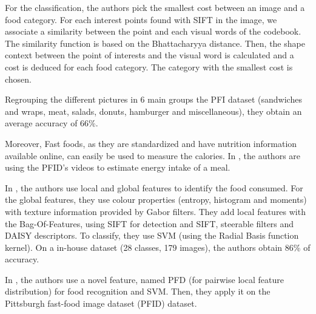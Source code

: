 For the classification, the authors pick the smallest cost between an image and a food category. For each interest points found with SIFT in the image, we associate a similarity between the point and each visual words of the codebook. The similarity function is based on the Bhattacharyya distance. Then, the shape context between the point of interests and the visual word is calculated and a cost is deduced for each food category. The category with the smallest cost is chosen.

Regrouping the different pictures in 6 main groups the PFI dataset (sandwiches and wraps, meat, salads, donuts, hamburger and miscellaneous), they obtain an average accuracy of 66\%.

Moreover, Fast foods, as they are standardized and have nutrition information available online, can easily be used to measure the calories. In \cite{Wen2009}, the authors are using the PFID's videos to estimate energy intake of a meal.

In \cite{Bosch2011}, the authors use local and global features to identify the food consumed.
For the global features, they use colour properties (entropy, histogram and moments) with texture information provided by Gabor filters. They add local features with the Bag-Of-Features, using SIFT for detection and SIFT, steerable filters and DAISY descriptors. To classify, they use SVM (using the Radial Basis function kernel).
On a in-house dataset (28 classes, 179 images), the authors obtain 86\% of accuracy.


In \cite{Yang2010}, the authors use a novel feature, named PFD (for pairwise local feature distribution) for food recognition and SVM. Then, they apply it on the Pittsburgh fast-food image dataset (PFID) dataset.

